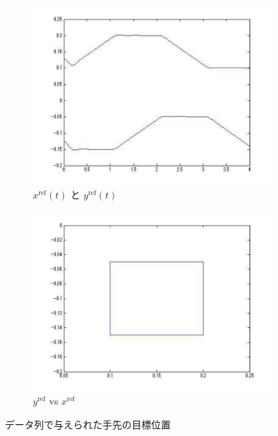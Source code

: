 \begin{figure}[H]
    \centering
    \begin{subfigure}[b]{0.45\linewidth}
        \centering
        \includegraphics[width=\linewidth]{figure/sim_anime_2_grafu.pdf}
        \caption{$x^{\mathrm{ref}}(t)$ と $y^{\mathrm{ref}}(t)$}
    \end{subfigure}
    \begin{subfigure}[b]{0.45\linewidth}
        \centering
        \includegraphics[width=\linewidth]{figure/sim_anime_2.pdf}
        \caption{$y^{\mathrm{ref}}$ vs $x^{\mathrm{ref}}$}
    \end{subfigure}
    \caption{データ列で与えられた手先の目標位置}
    \label{fig:xy_ref_data}
\end{figure}

